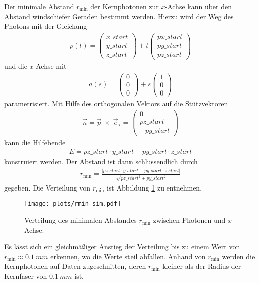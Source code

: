 Der minimale Abstand $r_{\mathrm{min}}$ der Kernphotonen zur $x$-Achse kann über den Abstand windschiefer Geraden bestimmt werden. Hierzu wird der Weg des Photons mit der Gleichung
\begin{align}
    p(t) = \left(\begin{array}{c} x\_start \\ y\_start \\ z\_start \end{array}\right)
        + t \left(\begin{array}{c} px\_start \\ py\_start \\ pz\_start \end{array}\right)
\end{align}
und die $x$-Achse mit
\begin{align}
    a(s) = \left(\begin{array}{c} 0 \\ 0 \\ 0 \end{array}\right)
        + s \left(\begin{array}{c} 1 \\ 0 \\ 0 \end{array}\right)
\end{align}
parametrisiert.
Mit Hilfe des orthogonalen Vektors auf die Stützvektoren
\begin{align}
    \vec{n} = \vec{p}\; \times \; \vec{e}_{\mathrm{x}} = \left(\begin{array}{c} 0 \\ pz\_start \\ -py\_start \end{array}\right)
\end{align}
kann die Hilfebende
\begin{align}
    E = pz\_start \cdot y\_start - py\_start \cdot z\_start
\end{align}
konstruiert werden. Der Abstand ist dann schlussendlich durch
\begin{align}
    r_{\mathrm{min}} = \frac{|pz\_start \cdot y\_start - py\_start \cdot z\_start|}{\sqrt{pz\_start ^2 + py\_start^2}}
\end{align}
gegeben. Die Verteilung von $r_{\mathrm{min}}$ ist Abbildung \ref{fig:rmin_sim} zu entnehmen.
\begin{figure}
    \centering
    \texttt{[image: plots/rmin\_sim.pdf]}
    \caption{Verteilung des minimalen Abstandes $r_{\mathrm{min}}$ zwischen Photonen und $x$-Achse.}
    \label{fig:rmin_sim}
\end{figure}
\FloatBarrier
Es lässt sich ein gleichmäßiger Anstieg der Verteilung bis zu einem Wert von $r_{\mathrm{min}} \approx \SI{0.1}{mm}$ erkennen, wo die Werte steil abfallen.
Anhand von $r_{\mathrm{min}}$ werden die Kernphotonen auf Daten zugeschnitten, deren $r_{\mathrm{min}}$ kleiner als der Radius der Kernfaser von $\SI{0.1}{mm}$ ist.\\

